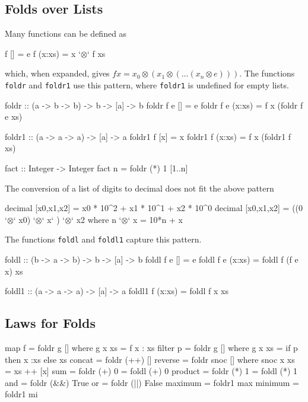 \documentclass[10pt]{article}
\begin{document}
\subsection{Folds over Lists}
Many functions can be defined as
\begin{code}
f [] = e
f (x:xs) = x `$\otimes$` f xs
\end{code}
which, when expanded, gives $f x = x_0\otimes(x_1\otimes(\ldots(x_n\otimes e)))$.  The functions \texttt{foldr} and \texttt{foldr1} use this pattern, where \texttt{foldr1} is undefined for empty lists.
\begin{code}
foldr :: (a -> b -> b) -> b -> [a] -> b
foldr f e [] = e
foldr f e (x:xs) = f x (foldr f e xs)

foldr1 :: (a -> a -> a) -> [a] -> a
foldr1 f [x] = x
foldr1 f (x:xs) = f x (foldr1 f xs)

fact :: Integer -> Integer
fact n = foldr (*) 1 [1..n]
\end{code}
The conversion of a list of digits to decimal does not fit the above pattern
\begin{code}
decimal [x0,x1,x2] = x0 * 10^2 + x1 * 10^1 + x2 * 10^0
decimal [x0,x1,x2] = ((0 `$\otimes$` x0) `$\otimes$` x` ) `$\otimes$` x2
                      where n `$\otimes$` x = 10*n + x
\end{code}
The functions \texttt{foldl} and \texttt{foldl1} capture this pattern.
\begin{code}
foldl :: (b -> a -> b) -> b -> [a] -> b
foldl f e [] = e
foldl f e (x:xs) = foldl f (f e x) xs

foldl1 :: (a -> a -> a) -> [a] -> a
foldl1 f (x:xs) = foldl f x xs
\end{code}
\subsection{Laws for Folds}
\begin{code}
map f = foldr g [] where g x xs = f x : xs
filter p = foldr g [] 
             where g x xs = if p then x :xs else xs
concat = foldr (++) []
reverse = foldr snoc [] where snoc x xs = xs ++ [x]
sum = foldr (+) 0 = foldl (+) 0
product = foldr (*) 1 = foldl (*) 1
and = foldr (&&) True
or = foldr (||) False
maximum = foldr1 max
minimum = foldr1 mi
\end{code}
\end{document}
